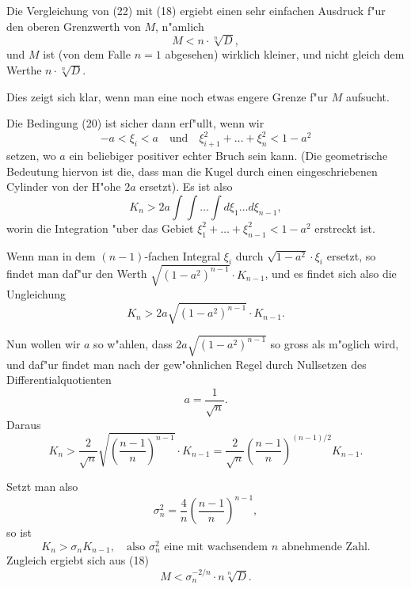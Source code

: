 \documentclass[12pt,a4paper]{article}
\theoremstyle{definition}
\begin{document}
Die Vergleichung von (22) mit (18) ergiebt einen sehr einfachen Ausdruck f"ur den oberen Grenzwerth von $M$, n"amlich
\begin{equation}
M < n \cdot \sqrt[n]{D},
\end{equation}
und $M$ ist (von dem Falle $n = 1$ abgesehen) wirklich kleiner, und nicht gleich dem Werthe $n \cdot \sqrt[n]{D}$.

Dies zeigt sich klar, wenn man eine noch etwas engere Grenze f"ur $M$ aufsucht.

Die Bedingung (20) ist sicher dann erf"ullt, wenn wir
\begin{equation}
-a < \xi_i < a \quad \text{und} \quad \xi_{i+1}^2 + \dots + \xi_n^2 < 1 - a^2
\end{equation}
setzen, wo $a$ ein beliebiger positiver echter Bruch sein kann. (Die geometrische Bedeutung hiervon ist die, dass man die Kugel durch einen eingeschriebenen Cylinder von der H"ohe $2a$ ersetzt). Es ist also
\begin{equation}
K_n > 2a \int\!\!\int\!\dots\!\int d\xi_1 \dots d\xi_{n-1},
\end{equation}
worin die Integration "uber das Gebiet $\xi_1^2 + \dots + \xi_{n-1}^2 < 1 - a^2$ erstreckt ist.

Wenn man in dem $(n-1)$-fachen Integral $\xi_i$ durch $\sqrt{1-a^2} \cdot \xi_i$ ersetzt, so findet man daf"ur den Werth $\sqrt{(1-a^2)^{n-1}} \cdot K_{n-1}$, und es findet sich also die Ungleichung
\begin{equation}
K_n > 2a \sqrt{(1-a^2)^{n-1}} \cdot K_{n-1}.
\end{equation}

Nun wollen wir $a$ so w"ahlen, dass $2a\sqrt{(1-a^2)^{n-1}}$ so gross als m"oglich wird, und daf"ur findet man nach der gew"ohnlichen Regel durch Nullsetzen des Differentialquotienten
\begin{equation}
a = \frac{1}{\sqrt{n}}.
\end{equation}
Daraus
\begin{equation}
K_n > \frac{2}{\sqrt{n}} \sqrt{\left(\frac{n-1}{n}\right)^{n-1}} \cdot K_{n-1} = \frac{2}{\sqrt{n}} \left(\frac{n-1}{n}\right)^{(n-1)/2} K_{n-1}.
\end{equation}

Setzt man also
\begin{equation}
\sigma_n^2 = \frac{4}{n} \left(\frac{n-1}{n}\right)^{n-1},
\end{equation}
so ist
\begin{equation}
K_n > \sigma_n K_{n-1}, \quad \text{also } \sigma_n^2 \text{ eine mit wachsendem } n \text{ abnehmende Zahl.}
\end{equation}
Zugleich ergiebt sich aus (18)
\begin{equation}
M < \sigma_n^{-2/n} \cdot n \sqrt[n]{D}.
\end{equation}
\end{document}
